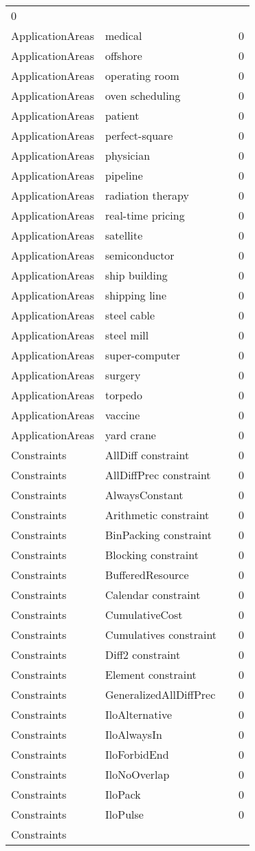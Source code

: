 {\begin{longtable}{lp{10cm}rr}
0\\ApplicationAreas & medical &  & 0\\ApplicationAreas & offshore &  & 0\\ApplicationAreas & operating room &  & 0\\ApplicationAreas & oven scheduling &  & 0\\ApplicationAreas & patient &  & 0\\ApplicationAreas & perfect-square &  & 0\\ApplicationAreas & physician &  & 0\\ApplicationAreas & pipeline &  & 0\\ApplicationAreas & radiation therapy &  & 0\\ApplicationAreas & real-time pricing &  & 0\\ApplicationAreas & satellite &  & 0\\ApplicationAreas & semiconductor &  & 0\\ApplicationAreas & ship building &  & 0\\ApplicationAreas & shipping line &  & 0\\ApplicationAreas & steel cable &  & 0\\ApplicationAreas & steel mill &  & 0\\ApplicationAreas & super-computer &  & 0\\ApplicationAreas & surgery &  & 0\\ApplicationAreas & torpedo &  & 0\\ApplicationAreas & vaccine &  & 0\\ApplicationAreas & yard crane &  & 0\\Constraints & AllDiff constraint &  & 0\\Constraints & AllDiffPrec constraint &  & 0\\Constraints & AlwaysConstant &  & 0\\Constraints & Arithmetic constraint &  & 0\\Constraints & BinPacking constraint &  & 0\\Constraints & Blocking constraint &  & 0\\Constraints & BufferedResource &  & 0\\Constraints & Calendar constraint &  & 0\\Constraints & CumulativeCost &  & 0\\Constraints & Cumulatives constraint &  & 0\\Constraints & Diff2 constraint &  & 0\\Constraints & Element constraint &  & 0\\Constraints & GeneralizedAllDiffPrec &  & 0\\Constraints & IloAlternative &  & 0\\Constraints & IloAlwaysIn &  & 0\\Constraints & IloForbidEnd &  & 0\\Constraints & IloNoOverlap &  & 0\\Constraints & IloPack &  & 0\\Constraints & IloPulse &  & 0\\Constraints & 
\end{longtable}}

